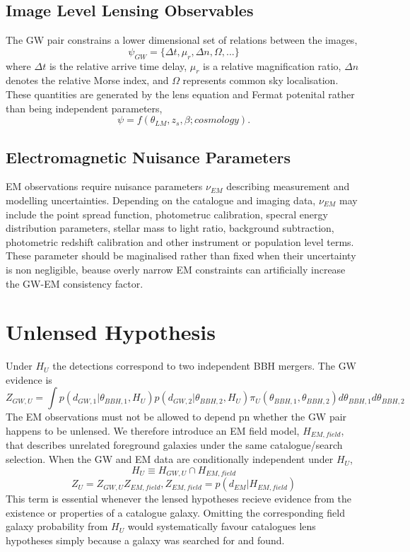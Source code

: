 \documentclass[pdflatex,sn-mathphys-num]{sn-jnl}%
\theoremstyle{thmstyleone}%
\theoremstyle{thmstyletwo}%
\theoremstyle{thmstylethree}%
\begin{document}
\subsection{Image Level Lensing Observables}

The GW pair constrains a lower dimensional set of relations between the images,
\begin{equation}
\psi_{GW}=\{\Delta t, \mu_r, \Delta n, \Omega, ...\}
\end{equation}
where $\Delta t$ is the relative arrive time delay, $\mu_r$ is a relative magnification ratio, $\Delta n$ denotes the relative Morse index, and $\Omega$ represents common sky localisation.
These quantities are generated by the lens equation and Fermat potenital rather than being independent parameters,
\begin{equation}
\psi=f(\theta_{LM},z_s,\beta;cosmology).
\end{equation}

\subsection{Electromagnetic Nuisance Parameters}

EM observations require nuisance parameters $\nu_{EM}$ describing measurement and modelling uncertainties.
Depending on the catalogue and imaging data, $\nu_{EM}$ may include the point spread function, photometruc calibration, specral energy distribution parameters, stellar mass to light ratio, background subtraction, photometric redshift calibration and other instrument or population level terms.
These parameter should be maginalised rather than fixed when their uncertainty is non negligible, beause overly narrow EM constraints can artificially increase the GW-EM consistency factor.

\section{Unlensed Hypothesis}
Under $H_U$ the detections correspond to two independent BBH mergers.
The GW evidence is
\begin{equation}
Z_{GW,U} = \int p(d_{GW,1}|\theta_{BBH,1},H_U) p(d_{GW,2}|\theta_{BBH,2},H_U) \pi_U(\theta_{BBH,1},\theta_{BBH,2})d\theta_{BBH,1}d\theta_{BBH,2}
\end{equation}
The EM observations must not be allowed to depend pn whether the GW pair happens to be unlensed.
We therefore introduce an EM field model, $H_{EM,field}$, that describes unrelated foreground galaxies under the same catalogue/search selection.
When the GW and EM data are conditionally independent under $H_U$,
\begin{equation}
H_U \equiv H_{GW,U} \cap H_{EM,field}
\end{equation}
\begin{equation}
Z_U = Z_{GW,U} Z_{EM,field}, Z_{EM,field} = p(d_{EM}|H_{EM,field})
\end{equation}
This term is essential whenever the lensed hypotheses recieve evidence from the existence or properties of a catalogue galaxy.
Omitting the corresponding field galaxy probability from $H_U$ would systematically favour catalogues lens hypotheses simply because a galaxy was searched for and found.
\end{document}
